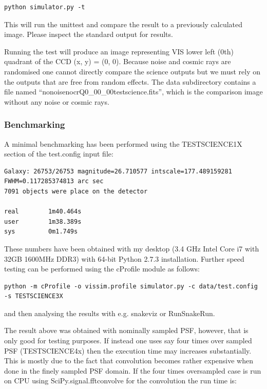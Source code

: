 \documentclass[a4paper,11pt,english]{sphinxmanual}
\begin{document}
\begin{Verbatim}[commandchars=\\\{\}]
python simulator.py -t
\end{Verbatim}

This will run the unittest and compare the result to a previously calculated image.
Please inspect the standard output for results.

Running the test will produce an image representing VIS lower left (0th) quadrant of the CCD (x, y) = (0, 0). Because
noise and cosmic rays are randomised one cannot directly compare the science
outputs but we must rely on the outputs that are free from random effects. The data subdirectory
contains a file named ``nonoisenocrQ0\_00\_00testscience.fits'', which is the comparison image without
any noise or cosmic rays.


\subsubsection{Benchmarking}
\label{simulator:benchmarking}
A minimal benchmarking has been performed using the TESTSCIENCE1X section of the test.config input file:

\begin{Verbatim}[commandchars=\\\{\}]
Galaxy: 26753/26753 magnitude=26.710577 intscale=177.489159281 FWHM=0.117285374813 arc sec
7091 objects were place on the detector

real        1m40.464s
user        1m38.389s
sys         0m1.749s
\end{Verbatim}

These numbers have been obtained with my desktop (3.4 GHz Intel Core i7 with 32GB 1600MHz DDR3) with
64-bit Python 2.7.3 installation. Further speed testing can be performed using the cProfile module
as follows:

\begin{Verbatim}[commandchars=\\\{\}]
python -m cProfile -o vissim.profile simulator.py -c data/test.config -s TESTSCIENCE3X
\end{Verbatim}

and then analysing the results with e.g. snakeviz or RunSnakeRun.

The result above was obtained with nominally sampled PSF, however, that is only good for
testing purposes. If instead one uses say four times over sampled PSF (TESTSCIENCE4x) then the
execution time may increases substantially. This is mostly due to the fact that convolution
becomes rather expensive when done in the finely sampled PSF domain. If the four times oversampled case
is run on CPU using SciPy.signal.fftconvolve for the convolution the run time is:
\end{document}
